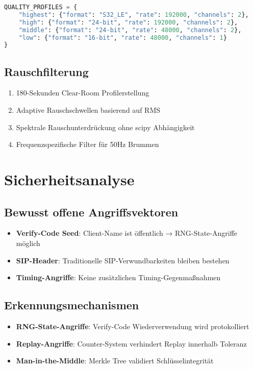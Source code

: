 \documentclass[10pt,a4paper]{article}
\begin{document}
\begin{lstlisting}[language=Python,caption=Audio-Konfiguration]
QUALITY_PROFILES = {
    "highest": {"format": "S32_LE", "rate": 192000, "channels": 2},
    "high": {"format": "24-bit", "rate": 192000, "channels": 2},
    "middle": {"format": "24-bit", "rate": 48000, "channels": 2},
    "low": {"format": "16-bit", "rate": 48000, "channels": 1}
}
\end{lstlisting}

\subsection{Rauschfilterung}

\begin{enumerate}
\item 180-Sekunden Clear-Room Profilerstellung
\item Adaptive Rauschschwellen basierend auf RMS
\item Spektrale Rauschunterdrückung ohne scipy Abhängigkeit
\item Frequenzspezifische Filter für 50Hz Brummen
\end{enumerate}

\section{Sicherheitsanalyse}

\subsection{Bewusst offene Angriffsvektoren}

\begin{itemize}
\item \textbf{Verify-Code Seed}: Client-Name ist öffentlich → RNG-State-Angriffe möglich
\item \textbf{SIP-Header}: Traditionelle SIP-Verwundbarkeiten bleiben bestehen
\item \textbf{Timing-Angriffe}: Keine zusätzlichen Timing-Gegenmaßnahmen
\end{itemize}

\subsection{Erkennungsmechanismen}

\begin{itemize}
\item \textbf{RNG-State-Angriffe}: Verify-Code Wiederverwendung wird protokolliert
\item \textbf{Replay-Angriffe}: Counter-System verhindert Replay innerhalb Toleranz
\item \textbf{Man-in-the-Middle}: Merkle Tree validiert Schlüsselintegrität
\end{itemize}
\end{document}
